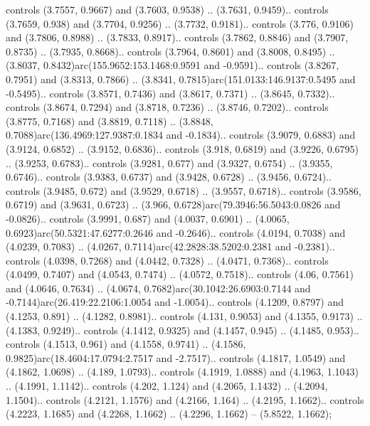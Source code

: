 controls (3.7557, 0.9667) and (3.7603, 0.9538) .. (3.7631, 0.9459).. controls (3.7659, 0.938) and (3.7704, 0.9256) .. (3.7732, 0.9181).. controls (3.776, 0.9106) and (3.7806, 0.8988) .. (3.7833, 0.8917).. controls (3.7862, 0.8846) and (3.7907, 0.8735) .. (3.7935, 0.8668).. controls (3.7964, 0.8601) and (3.8008, 0.8495) .. (3.8037, 0.8432)arc(155.9652:153.1468:0.9591 and -0.9591).. controls (3.8267, 0.7951) and (3.8313, 0.7866) .. (3.8341, 0.7815)arc(151.0133:146.9137:0.5495 and -0.5495).. controls (3.8571, 0.7436) and (3.8617, 0.7371) .. (3.8645, 0.7332).. controls (3.8674, 0.7294) and (3.8718, 0.7236) .. (3.8746, 0.7202).. controls (3.8775, 0.7168) and (3.8819, 0.7118) .. (3.8848, 0.7088)arc(136.4969:127.9387:0.1834 and -0.1834).. controls (3.9079, 0.6883) and (3.9124, 0.6852) .. (3.9152, 0.6836).. controls (3.918, 0.6819) and (3.9226, 0.6795) .. (3.9253, 0.6783).. controls (3.9281, 0.677) and (3.9327, 0.6754) .. (3.9355, 0.6746).. controls (3.9383, 0.6737) and (3.9428, 0.6728) .. (3.9456, 0.6724).. controls (3.9485, 0.672) and (3.9529, 0.6718) .. (3.9557, 0.6718).. controls (3.9586, 0.6719) and (3.9631, 0.6723) .. (3.966, 0.6728)arc(79.3946:56.5043:0.0826 and -0.0826).. controls (3.9991, 0.687) and (4.0037, 0.6901) .. (4.0065, 0.6923)arc(50.5321:47.6277:0.2646 and -0.2646).. controls (4.0194, 0.7038) and (4.0239, 0.7083) .. (4.0267, 0.7114)arc(42.2828:38.5202:0.2381 and -0.2381).. controls (4.0398, 0.7268) and (4.0442, 0.7328) .. (4.0471, 0.7368).. controls (4.0499, 0.7407) and (4.0543, 0.7474) .. (4.0572, 0.7518).. controls (4.06, 0.7561) and (4.0646, 0.7634) .. (4.0674, 0.7682)arc(30.1042:26.6903:0.7144 and -0.7144)arc(26.419:22.2106:1.0054 and -1.0054).. controls (4.1209, 0.8797) and (4.1253, 0.891) .. (4.1282, 0.8981).. controls (4.131, 0.9053) and (4.1355, 0.9173) .. (4.1383, 0.9249).. controls (4.1412, 0.9325) and (4.1457, 0.945) .. (4.1485, 0.953).. controls (4.1513, 0.961) and (4.1558, 0.9741) .. (4.1586, 0.9825)arc(18.4604:17.0794:2.7517 and -2.7517).. controls (4.1817, 1.0549) and (4.1862, 1.0698) .. (4.189, 1.0793).. controls (4.1919, 1.0888) and (4.1963, 1.1043) .. (4.1991, 1.1142).. controls (4.202, 1.124) and (4.2065, 1.1432) .. (4.2094, 1.1504).. controls (4.2121, 1.1576) and (4.2166, 1.164) .. (4.2195, 1.1662).. controls (4.2223, 1.1685) and (4.2268, 1.1662) .. (4.2296, 1.1662) -- (5.8522, 1.1662);



